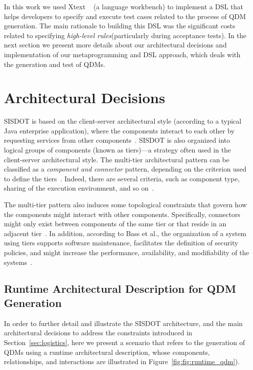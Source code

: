 \documentclass{bmcart}
\newcommand{\callers}{\emph{high-level rules}\xspace}
\begin{document}
In this work we used Xtext ~\cite{eysholdt2010} (a language workbench) to implement a DSL that helps developers to specify and execute test cases related to the process of QDM generation. The main rationale to building this DSL was the significant costs related to specifying \callers (particularly during acceptance tests). In the next section we present more details about our architectural decisions and implementation of our metaprogramming and DSL approach, which deals with the generation and test of QDMs. 








\section*{Architectural Decisions}
\label{sec:architecture} 

SISDOT is based on the client-server architectural style (according to a typical Java enterprise application), where the components interact to each other by requesting services from other components~\cite{clements2011documenting}. SISDOT is also organized into logical groups of components (known as tiers)---a strategy often used in the client-server architectural style. The multi-tier architectural pattern can be classified as a \emph{component and connector} pattern, depending on the criterion used to define the tiers~\cite{bass2013software}. Indeed, there are several criteria, such as component type, sharing of the execution environment, 
and so on~\cite{clements2011documenting}.

The multi-tier pattern also induces some topological constraints that govern how the components might interact with other components. 
Specifically, connectors might only exist between components of the same tier or that reside in an adjacent tier~\cite{clements2011documenting}. In addition, according to Bass et al., the organization of a system using tiers supports software maintenance, facilitates the definition of security policies, and might increase the performance, availability, and modifiability of 
the systems~\cite{bass2013software}. 



\subsection*{Runtime Architectural Description for QDM Generation}
In order to further detail and illustrate the SISDOT architecture, and the main architectural decisions to address the constraints introduced in Section~\ref{sec:logistics}, here we present a scenario that refers to the generation of QDMs using a runtime architectural description, whose components, relationships, and interactions are illustrated in Figure~\ref{fig:fig:runtime_qdm}). 
\end{document}
